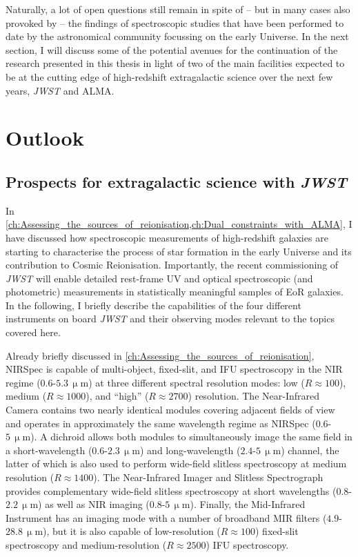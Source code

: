 Naturally, a lot of open questions still remain in spite of -- but in many cases also provoked by -- the findings of spectroscopic studies that have been performed to date by the astronomical community focussing on the early Universe. In the next section, I will discuss some of the potential avenues for the continuation of the research presented in this thesis in light of two of the main facilities expected to be at the cutting edge of high-redshift extragalactic science over the next few years, \textit{JWST} and ALMA.

\section{Outlook}
\label{chCsec:Outlook}

\subsection{Prospects for extragalactic science with \textit{JWST}}
\label{chCssec:JWST}

In \cref{ch:Assessing_the_sources_of_reionisation,ch:Dual_constraints_with_ALMA}, I have discussed how spectroscopic measurements of high-redshift galaxies are starting to characterise the process of star formation in the early Universe and its contribution to Cosmic Reionisation. Importantly, the recent commissioning of \textit{JWST} \citep{2006SSRv..123..485G} will enable detailed rest-frame UV and optical spectroscopic (and photometric) measurements in statistically meaningful samples of EoR galaxies. In the following, I briefly describe the capabilities of the four different instruments on board \textit{JWST} and their observing modes relevant to the topics covered here.

Already briefly discussed in \cref{ch:Assessing_the_sources_of_reionisation}, NIRSpec \citep{2022A&A...661A..80J, 2022A&A...661A..81F} is capable of multi-object, fixed-slit, and IFU spectroscopy in the NIR regime ($0.6$-$5.3 \, \mathrm{\upmu m}$) at three different spectral resolution modes: low ($R \approx 100$), medium ($R \approx 1000$), and ``high'' ($R \approx 2700$) resolution. The Near-Infrared Camera \citep[NIRCam;][]{2005SPIE.5904....1R, 2012SPIE.8442E..2NB} contains two nearly identical modules covering adjacent fields of view and operates in approximately the same wavelength regime as NIRSpec ($0.6$-$5 \, \mathrm{\upmu m}$). A dichroid allows both modules to simultaneously image the same field in a short-wavelength ($0.6$-$2.3 \, \mathrm{\upmu m}$) and long-wavelength ($2.4$-$5 \, \mathrm{\upmu m}$) channel, the latter of which is also used to perform wide-field slitless spectroscopy at medium resolution ($R \approx 1400$). The Near-Infrared Imager and Slitless Spectrograph \citep[NIRISS;][]{2012SPIE.8442E..2RD} provides complementary wide-field slitless spectroscopy at short wavelengths ($0.8$-$2.2 \, \mathrm{\upmu m}$) as well as NIR imaging ($0.8$-$5 \, \mathrm{\upmu m}$). Finally, the Mid-Infrared Instrument \citep[MIRI;][]{2015PASP..127..584R} has an imaging mode with a number of broadband MIR filters ($4.9$-$28.8 \, \mathrm{\upmu m}$), but it is also capable of low-resolution ($R \approx 100$) fixed-slit spectroscopy and medium-resolution ($R \approx 2500$) IFU spectroscopy.

